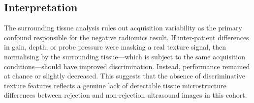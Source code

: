 \subsection{Interpretation}

The surrounding tissue analysis rules out acquisition variability as the primary confound responsible for the negative radiomics result. If inter-patient differences in gain, depth, or probe pressure were masking a real texture signal, then normalising by the surrounding tissue---which is subject to the same acquisition conditions---should have improved discrimination. Instead, performance remained at chance or slightly decreased. This suggests that the absence of discriminative texture features reflects a genuine lack of detectable tissue microstructure differences between rejection and non-rejection ultrasound images in this cohort.

\newpage
